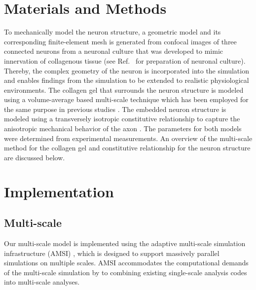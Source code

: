 \documentclass[]{interact}
\begin{document}
\section{Materials and Methods}
\label{sec:materials_and_methods}
To mechanically model the neuron structure, a geometric model and its corresponding finite-element mesh is generated from confocal images of three connected neurons from a neuronal culture that was developed to mimic innervation of collagenous tissue (see Ref.\  for preparation of neuronal culture). Thereby, the complex geometry of the neuron is incorporated into the simulation and enables findings from the simulation to be extended to realistic physiological environments. The collagen gel that surrounds the neuron structure is modeled using a volume-average based multi-scale technique which has been employed for the same purpose in previous studies \citep{Chandran:2007hy,Stylianopoulos:2007dp,Barocas:2007gk,Lai:2012ji,Lake:2012jm}. The embedded neuron structure is modeled using a transversely isotropic constitutive relationship to capture the anisotropic mechanical behavior of the axon \citep{Peter:2012fc}. The parameters for both models were determined from experimental measurements. An overview of the multi-scale method for the collagen gel and constitutive relationship for the neuron structure are discussed below.

\section{Implementation}
\label{sec:implementation}

\subsection{Multi-scale}
Our multi-scale model is implemented using the adaptive multi-scale simulation infrastructure (AMSI) \citep{Tobin:2017ip}, which is designed to support massively parallel simulations on multiple scales. AMSI accommodates the computational demands of the multi-scale simulation by to combining existing single-scale analysis codes into multi-scale analyses.
\end{document}
